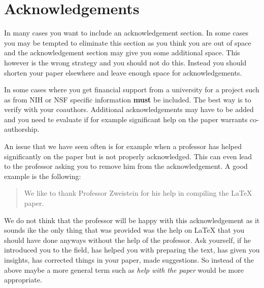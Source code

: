 \FILENAME

\section{Acknowledgements}
\label{S:acknowledgements}

In many cases you want to include an acknowledgement section. In some cases you may be tempted to eliminate this section as you think you are out of space and the acknowledgement section may give you some additional space. This however is the wrong strategy and you should not do this. Instead you should shorten your paper elsewhere and leave enough space for acknowledgements.

In some cases where you get financial support from a university for a project such as from NIH or NSF specific information {\bf must} be included. The best way is to verify with your coauthors. Additional acknowledgements may have to be added and you need te evaluate if for example significant help on the paper warrants co-authorship.

An issue that we have seen often is for example when a professor has helped significantly on the paper but is not properly acknowledged. This can even lead to the professor asking you to remove him from the acknowledgement. A good example is the following:

\begin{quote}
We like to thank Professor Zweistein for his help in compiling  the LaTeX paper.
\end{quote}

We do not think that the professor will be happy with this acknowledgement as it sounds ike the only thing that was provided was the help on LaTeX that you should have done anyways without the help of the professor. Ask yourself, if he introduced you to the field, has helped you with preparing the text, has given you insights, has corrected things in your paper, made suggestions. So instead of the above maybe a more general term such as {\em help with the paper} would be more appropriate.
